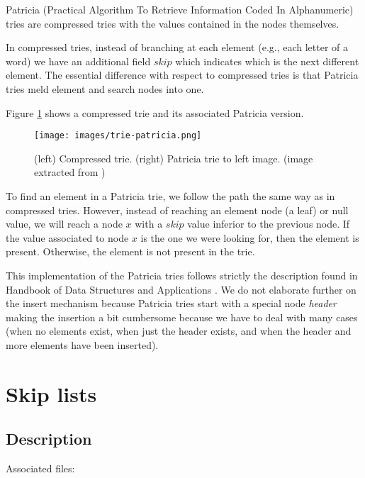 \documentclass[a4paper,10pt,table,xcdraw]{article}
\begin{document}
Patricia (Practical Algorithm To Retrieve Information Coded In
Alphanumeric) tries \cite{Knuth1998} are compressed tries \cite{Maly1976} with the values contained in the nodes themselves. 

In compressed tries, instead of branching at each element (e.g., each letter of a word) we have an additional field $skip$ which indicates which is the next different element. The essential difference with respect to compressed tries is that Patricia tries meld element and search nodes into one.

Figure \ref{fig:trie-patricia} shows a compressed trie and its associated Patricia version.


\begin{figure}[H]
\centering
\texttt{[image: images/trie-patricia.png]}
\caption{(left) Compressed trie. (right) Patricia trie to left image. (image extracted from \cite{Mehta2005})  }
\label{fig:trie-patricia}
\end{figure}

To find an element in a Patricia trie, we follow the path the same way as in compressed tries. However, instead of reaching an element node (a leaf) or null value, we will reach a node $x$ with a $skip$ value inferior to the previous node. If the value associated to node $x$ is the one we were looking for, then the element is present. Otherwise, the element is not present in the trie.

This implementation of the Patricia tries follows strictly the description found in Handbook of Data Structures and Applications \cite{Mehta2005}. We do not elaborate further on the insert mechanism because Patricia tries start with a special node \textit{header} making the insertion a bit cumbersome because we have to deal with many cases (when no elements exist, when just the header exists, and when the header and more elements have been inserted).




\section{Skip lists}
\label{sec:skip-lists}

\subsection{Description}

Associated files:
\end{document}
